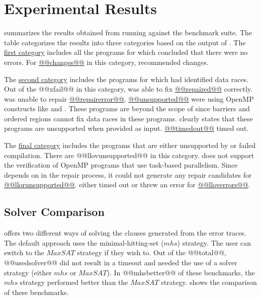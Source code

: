 \section{Experimental Results}
 summarizes the results obtained from running \tool against the benchmark suite. The table categorizes the results into three categories based on the output of \verifier. The \hyperlink{racefree}{first category} includes all the programs for which \verifier concluded that there were no errors. For \hyperlink{racefree_changes}{@@changes@@} in this category, \tool recommended changes.

The \hyperlink{racedetected}{second category} includes the programs for which \verifier had identified data races. Out of the @@xfail@@ in this category, \tool was able to fix \hyperlink{repaired}{@@repaired@@} correctly. \tool was unable to repair \hyperlink{repairerror}{@@repairerror@@}. \hyperlink{unsupported}{@@unsupported@@} were using OpenMP constructs like  and . These programs are beyond the scope of \tool since barriers and ordered regions cannot fix data races in these programs. \tool clearly states that these programs are unsupported when provided as input. \hyperlink{timedout}{@@timedout@@} timed out.

The \hyperlink{llovunsupported}{final category} includes the programs that are either unsupported by \verifier or failed compilation. There are @@llovunsupported@@ in this category. \verifier does not support the verification of OpenMP programs that use task-based parallelism. Since \tool depends on \verifier in the repair process, it could not generate any repair candidates for \hyperlink{llorunsupported}{@@llorunsupported@@}. \verifier either timed out or threw an error for \hyperlink{verifyerror}{@@lloverrors@@}.
 


\subsection{Solver Comparison}

\tool offers two different ways of solving the clauses generated from the error traces. The default approach uses the minimal-hitting-set ($mhs$) strategy. The user can switch to the $MaxSAT$ strategy if they wish to. Out of the @@total@@, @@usedsolver@@ did not result in a timeout and needed the use of a solver strategy (either $mhs$ or $MaxSAT$). In @@mhsbetter@@ of these benchmarks, the $mhs$ strategy performed better than the $MaxSAT$ strategy.  shows the comparison of these benchmarks.


